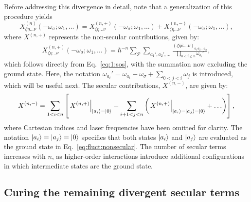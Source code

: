 \documentclass[12pt,a4paper]{article}
\begin{document}
Before addressing this divergence in detail, note that a generalization of this procedure yields \begin{equation}
	X^{(n)}_{\zeta \eta \ldots \nu}(-\omega_\sigma; \omega_1, \ldots)  = X^{(n,+)}_{\zeta \eta \ldots \nu}(-\omega_\sigma; \omega_1, \ldots)  + X^{(n,-)}_{\zeta \eta \ldots \nu}(-\omega_\sigma; \omega_1, \ldots) ,\label{eq:fluct}
\end{equation} where $X^{(n,+)}$ represents the non-secular contributions, given by:
\begin{align}
	X^{(n,+)}_{\zeta \eta \ldots \nu}(-\omega_\sigma; \omega_1, \ldots) = \hbar^{-n} \sum_\mathcal{P} \sum_{a_1', a_2', \ldots} \frac{(\zeta \bar{\eta} \bar{\kappa} \ldots \nu)_{a_1 a_2 \ldots a_n}}{\prod_{0 < i \leq n} \omega_{a_i}'} ,\label{eq:fluct:nonsecular}
\end{align}
which follows directly from Eq.~\eqref{eq:1:sos}, with the summation now excluding the ground state. Here, the notation $\omega_{a_i}' = \omega_{a_i} - \omega_\sigma + \sum_{0 < j < i} \omega_j$ is introduced, which will be useful next.
The secular contributions, $X^{(n,-)}$, are given by:
\begin{align}
	X^{(n,-)} = \sum_{1 < i < n} \left[ \left. X^{(n,+)} \right|_{\ket{a_i} = \ket{0}} + \sum_{i+1 < j < n} \left( \left. X^{(n,+)} \right|_{\ket{a_i} = \ket{a_j} = \ket{0}} + \ldots \right) \right],\label{eq:fluct:secular}
\end{align}
where Cartesian indices and laser frequencies have been omitted for clarity. The notation $\ket{a_i} = \ket{a_j} = \ket{0}$ specifies that both states $\ket{a_i}$ and $\ket{a_j}$ are evaluated as the ground state in Eq.~\eqref{eq:fluct:nonsecular}. The number of secular terms increases with $n$, as higher-order interactions introduce additional configurations in which intermediate states are the ground state. 

\subsection{Curing the remaining divergent secular terms}
\end{document}
